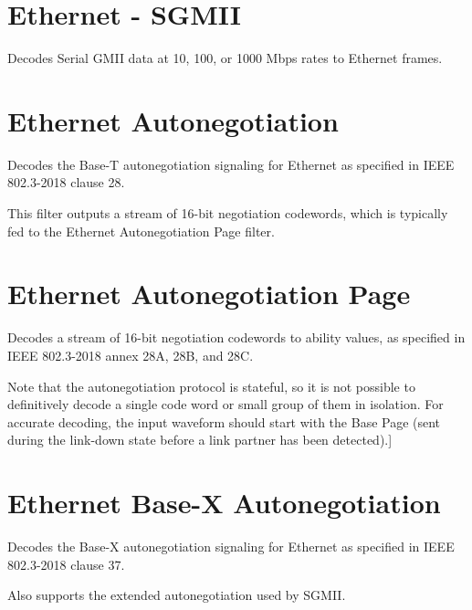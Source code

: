 \pagebreak
\section{Ethernet - SGMII}
\label{filter:sgmii}

Decodes Serial GMII data at 10, 100, or 1000 Mbps rates to Ethernet frames.

\pagebreak
\section{Ethernet Autonegotiation}

Decodes the Base-T autonegotiation signaling for Ethernet as specified in IEEE 802.3-2018 clause 28.

This filter outputs a stream of 16-bit negotiation codewords, which is typically fed to the Ethernet Autonegotiation
Page filter.

\pagebreak
\section{Ethernet Autonegotiation Page}

Decodes a stream of 16-bit negotiation codewords to ability values, as specified in IEEE 802.3-2018 annex 28A, 28B, and
28C.

Note that the autonegotiation protocol is stateful, so it is not possible to definitively decode a single code word or
small group of them in isolation. For accurate decoding, the input waveform should start with the Base Page (sent
during the link-down state before a link partner has been detected).]

\pagebreak
\section{Ethernet Base-X Autonegotiation}

Decodes the Base-X autonegotiation signaling for Ethernet as specified in IEEE 802.3-2018 clause 37.

Also supports the extended autonegotiation used by SGMII.

